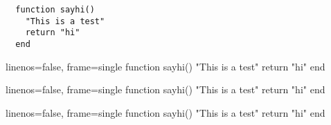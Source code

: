 \documentclass{article}
\begin{document}
\begin{verbatim}
  function sayhi()
    "This is a test"
    return "hi"
  end
\end{verbatim}

\begin{jlcode}{linenos=false, frame=single}
  function sayhi()
    "This is a test"
    return "hi"
  end
\end{jlcode}

\begin{juliablock*}{linenos=false, frame=single}
  function sayhi()
    "This is a test"
    return "hi"
  end
\end{juliablock*}

\begin{jlconverbatim}{linenos=false, frame=single}
  function sayhi()
    "This is a test"
    return "hi"
  end
\end{jlconverbatim}

\end{document}
